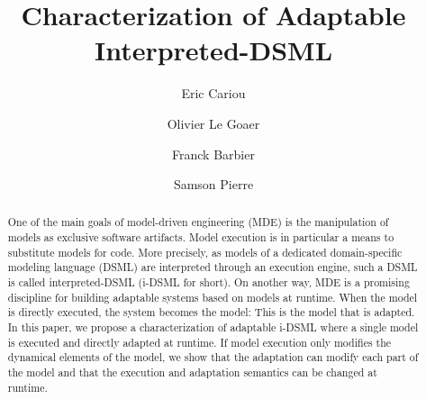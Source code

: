 \documentclass[english, 10pt]{llncs}
\begin{document}
%
\frontmatter          %
%
%
%
\title{Characterization of Adaptable Interpreted-DSML}

%
%
\author{Eric Cariou \and Olivier Le Goaer \and Franck Barbier \and Samson Pierre}
%
%
%

\maketitle 
\thispagestyle{empty}

\begin{abstract}
 
One of the main goals of model-driven engineering (MDE) is the
manipulation of models as exclusive software artifacts. Model
execution is in particular a means to substitute models for code. More
precisely, as models of a dedicated domain-specific modeling language
(DSML) are interpreted through an execution engine, such a DSML is
called interpreted-DSML (i-DSML for short). On another way, MDE is a
promising discipline for building adaptable systems based on models at
runtime. When the model is directly executed, the system becomes the
model: This is the model that is adapted. In this paper, we propose a
characterization of adaptable i-DSML where a single model is executed
and directly adapted at runtime. If model execution only modifies the
dynamical elements of the model, we show that the adaptation can
modify each part of the model and that the execution and adaptation
semantics can be changed at runtime.


\end{abstract}
\end{document}
